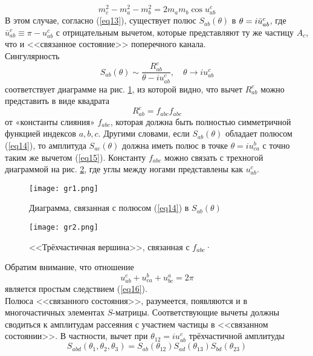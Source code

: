 \documentclass[12pt]{article}
\theoremstyle{definition}
\begin{document}
\begin{equation}\label{eq16}
    m_c^2-m_a^2-m_b^2=2m_am_b\cos u_{ab}^c
\end{equation}
В этом случае, согласно (\ref{eq13}), существует полюс $S_{ab}(\theta)$ в $\theta=i\Bar{u}_{ab}^c$, где $\bar{u}^c_{ab}\equiv\pi-u^c_{ab}$ с отрицательным вычетом, которые представляют ту же частицу $A_c$, что и <<связанное состояние>> поперечного канала.\\
Сингулярность
\begin{equation}\label{eq14}
    S_{ab}(\theta)\sim\frac{R^c_{ab}}{\theta-iu_{ab}^c},\quad\theta\rightarrow iu_{ab}^c
\end{equation}
соответствует диаграмме на рис. \ref{gr1}, из которой видно, что вычет $R^c_{ab}$ можно представить в виде квадрата
\begin{equation}\label{eq15}
    R^c_{ab}=f_{abc}f_{abc}
\end{equation}
от «константы слияния» $f_{abc}$, которая должна быть полностью симметричной функцией индексов $a, b, c$. Другими словами, если $S_{ab}(\theta)$ обладает полюсом (\ref{eq14}), то амплитуда $S_{ac}(\theta)$ должна иметь полюс в точке $\theta = iu_{ca}^b$ с точно таким же вычетом (\ref{eq15}). Константу $f_{abc}$ можно связать с трехногой диаграммой на рис. \ref{gr2}, где углы между ногами представлены как $u_{ab}^c$.
\begin{figure}
    \centering
    \texttt{[image: gr1.png]}
    \caption{Диаграмма, связанная с полюсом (\ref{eq14}) в $S_{ab}(\theta)$}
    \label{gr1}
\end{figure}
\begin{figure}
    \centering
    \texttt{[image: gr2.png]}
    \caption{<<Трёхчастичная вершина>>, связанная с $f_{abc}$·}
    \label{gr2}
\end{figure}
Обратим внимание, что отношение
\begin{equation}
    u_{ab}^c+u_{ca}^b+u_{bc}^a=2\pi
\end{equation}
является простым следствием (\ref{eq16}).\\
Полюса <<связанного состояния>>, разумеется, появляются и в многочастичных элементах $S$-матрицы. Соответствующие вычеты должны сводиться к амплитудам рассеяния с участием частицы в <<связанном состоянии>>. В частности, вычет при $\theta_{12}=iu_{ab}^c$ трёхчастичной амплитуды
\begin{equation}
    S_{abd}(\theta_1,\theta_2,\theta_3)=S_{ab}(\theta_{12})S_{ad}(\theta_{13})S_{bd}(\theta_{23})
\end{equation}
\end{document}
